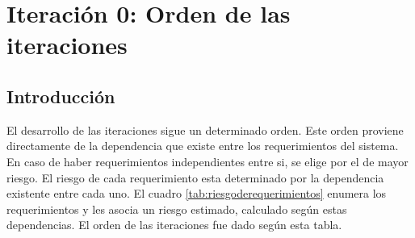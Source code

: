 \chapter{Iteración 0: Orden de las iteraciones} %
\label{cha:iteracion_0}

\section{Introducción} %
\label{it0:sec:introduccion}

El desarrollo de las iteraciones sigue un determinado orden. Este orden proviene directamente de la dependencia que existe entre los requerimientos del sistema. En caso de haber requerimientos independientes entre si, se elige por el de mayor riesgo. El riesgo de cada requerimiento esta determinado por la dependencia existente entre cada uno. El cuadro \ref{tab:riesgoderequerimientos} enumera los requerimientos y les asocia un riesgo estimado, calculado según estas dependencias. El orden de las iteraciones fue dado según esta tabla.

